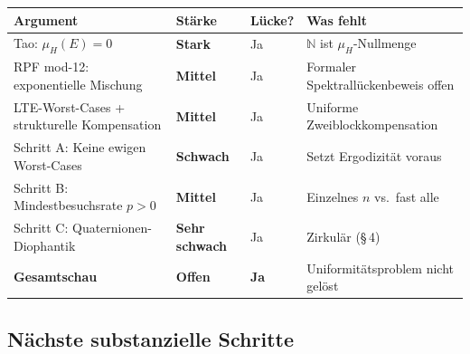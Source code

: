 \documentclass[12pt,a4paper]{article}
\newcommand{\N}{\mathbb{N}}
\begin{document}
\begin{tcolorbox}[bewmat]
\begin{center}
\renewcommand{\arraystretch}{1.5}
\begin{tabular}{>{\raggedright}p{4.2cm}
                >{\centering}p{1.6cm}
                >{\centering}p{1.6cm}
                >{\raggedright\arraybackslash}p{4.8cm}}
\toprule
\textbf{Argument} & \textbf{Stärke} & \textbf{Lücke?} & \textbf{Was fehlt} \\
\midrule
Tao: $\mu_H(E) = 0$
  & \textcolor{bewiesengrün}{\bfseries Stark}
  & Ja
  & $\N$ ist $\mu_H$-Nullmenge \\[2pt]
RPF mod-12: exponentielle Mischung
  & \textcolor{bewiesengrün}{\bfseries Mittel}
  & Ja
  & Formaler Spektrallückenbeweis offen \\[2pt]
LTE-Worst-Cases + strukturelle Kompensation
  & \textcolor{bewiesengrün}{\bfseries Mittel}
  & Ja
  & Uniforme Zweiblockkompensation \\[2pt]
Schritt A: Keine ewigen Worst-Cases
  & \textcolor{warnorange}{\bfseries Schwach}
  & Ja
  & Setzt Ergodizität voraus \\[2pt]
Schritt B: Mindestbesuchsrate $p > 0$
  & \textcolor{warnorange}{\bfseries Mittel}
  & Ja
  & Einzelnes $n$ vs.\ fast alle \\[2pt]
Schritt C: Quaternionen-Diophantik
  & \textcolor{lückenrot}{\bfseries Sehr schwach}
  & Ja
  & Zirkulär (§\,4) \\[2pt]
\midrule
\textbf{Gesamtschau}
  & \textcolor{warnorange}{\bfseries Offen}
  & \textbf{Ja}
  & Uniformitätsproblem nicht gelöst \\
\bottomrule
\end{tabular}
\end{center}
\end{tcolorbox}

\subsection{Nächste substanzielle Schritte}
\end{document}
